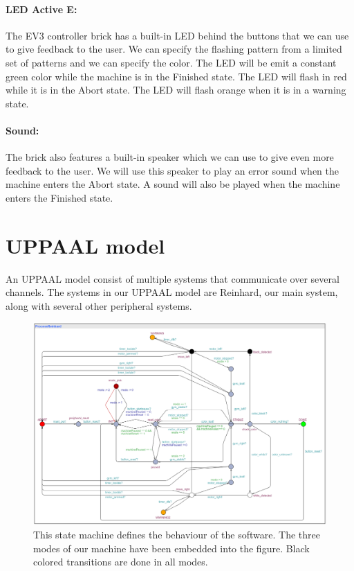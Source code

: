 \documentclass[a4paper,oneside,11pt]{article}
\begin{document}
\paragraph{LED Active E:} The EV3 controller brick has a built-in LED behind the buttons that we can use to give feedback to the user. We can specify the flashing pattern from a limited set of patterns and we can specify the color. The LED will be emit a constant green color while the machine is in the Finished state. The LED will flash in red while it is in the Abort state. The LED will flash orange when it is in a warning state.
\paragraph{Sound:} The brick also features a built-in speaker which we can use to give even more feedback to the user. We will use this speaker to play an error sound when the machine enters the Abort state. A sound will also be played when the machine enters the Finished state.

\section{UPPAAL model}
An UPPAAL model consist of multiple systems that communicate over several channels. The systems in our UPPAAL model are Reinhard, our main system, along with several other peripheral systems.

\begin{figure}[H]
	\centering
	\includegraphics[width=150mm]{mainprocess}
	\caption{This state machine defines the behaviour of the software. The three modes of our machine have been embedded into the figure. Black colored transitions are done in all modes.}
\end{figure}
\end{document}

